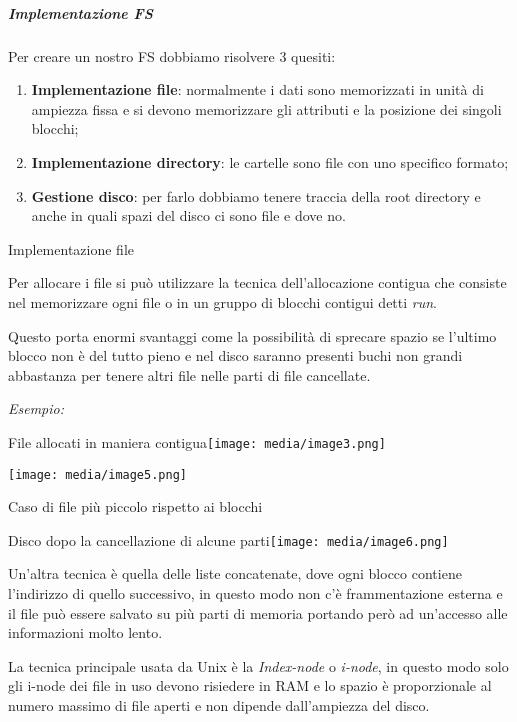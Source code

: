 \subparagraph{Implementazione FS}\label{implementazione-fs}

Per creare un nostro FS dobbiamo risolvere 3 quesiti:

\begin{enumerate}
\def\labelenumi{\arabic{enumi}.}
\item
  \textbf{Implementazione file}: normalmente i dati sono memorizzati in
  unità di ampiezza fissa e si devono memorizzare gli attributi e la
  posizione dei singoli blocchi;
\item
  \textbf{Implementazione directory}: le cartelle sono file con uno
  specifico formato;
\item
  \textbf{Gestione disco}: per farlo dobbiamo tenere traccia della root
  directory e anche in quali spazi del disco ci sono file e dove no.
\end{enumerate}

Implementazione file

Per allocare i file si può utilizzare la tecnica dell'allocazione
contigua che consiste nel memorizzare ogni file o in un gruppo di
blocchi contigui detti \emph{run}.

Questo porta enormi svantaggi come la possibilità di sprecare spazio se
l'ultimo blocco non è del tutto pieno e nel disco saranno presenti buchi
non grandi abbastanza per tenere altri file nelle parti di file
cancellate.

\emph{Esempio:}

File allocati in maniera
contigua\texttt{[image: media/image3.png]}

\texttt{[image: media/image5.png]}

Caso di file più piccolo rispetto ai blocchi

Disco dopo la cancellazione di alcune
parti\texttt{[image: media/image6.png]}

Un'altra tecnica è quella delle liste concatenate, dove ogni blocco
contiene l'indirizzo di quello successivo, in questo modo non c'è
frammentazione esterna e il file può essere salvato su più parti di
memoria portando però ad un'accesso alle informazioni molto lento.

La tecnica principale usata da Unix è la \emph{Index-node} o
\emph{i-node}, in questo modo solo gli i-node dei file in uso devono
risiedere in RAM e lo spazio è proporzionale al numero massimo di file
aperti e non dipende dall'ampiezza del disco.

